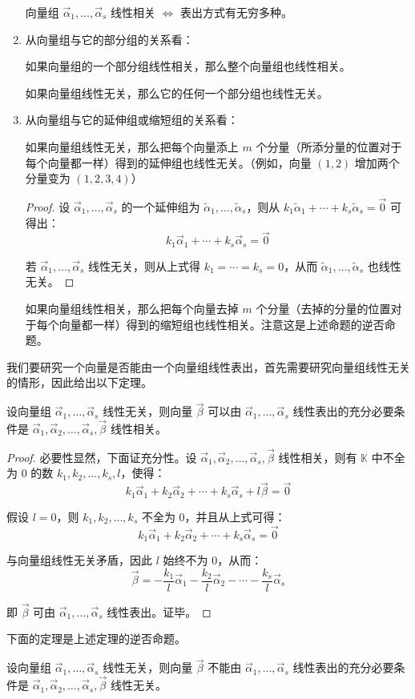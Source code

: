 \begin{enumerate}
	向量组 $\vec \alpha_1, \ldots, \vec \alpha_s$ 线性相关 $\Longleftrightarrow$ 表出方式有无穷多种。

	\item 从向量组与它的部分组的关系看：

	如果向量组的一个部分组线性相关，那么整个向量组也线性相关。

	如果向量组线性无关，那么它的任何一个部分组也线性无关。

	\item 从向量组与它的延伸组或缩短组的关系看：

	如果向量组线性无关，那么把每个向量添上 $m$ 个分量（所添分量的位置对于每个向量都一样）得到的延伸组也线性无关。（例如，向量 $(1, 2)$ 增加两个分量变为 $(1, 2, 3, 4)$）

	\begin{proof}
		设 $\vec \alpha_1, \ldots, \vec \alpha_s$ 的一个延伸组为 $\tilde \alpha_1, \ldots, \tilde \alpha_s$，则从 $k_1 \tilde \alpha_1 + \cdots + k_s \tilde \alpha_s = \vec 0$ 可得出：
		$$
		k_1 \vec \alpha_1 + \cdots + k_s \vec \alpha_s = \vec 0
		$$

		若 $\vec \alpha_1, \ldots, \vec \alpha_s$ 线性无关，则从上式得 $k_1 = \cdots = k_s = 0$，从而 $\tilde \alpha_1, \ldots, \tilde \alpha_s$ 也线性无关。
	\end{proof}

	如果向量组线性相关，那么把每个向量去掉 $m$ 个分量（去掉的分量的位置对于每个向量都一样）得到的缩短组也线性相关。注意这是上述命题的逆否命题。
\end{enumerate}

我们要研究一个向量是否能由一个向量组线性表出，首先需要研究向量组线性无关的情形，因此给出以下定理。

\begin{theorem}
	设向量组 $\vec \alpha_1, \ldots, \vec \alpha_s$ 线性无关，则向量 $\vec \beta$ 可以由 $\vec \alpha_1, \ldots, \vec \alpha_s$ 线性表出的充分必要条件是 $\vec \alpha_1, \vec \alpha_2, \ldots, \vec \alpha_s, \vec \beta$ 线性相关。
\end{theorem}

\begin{proof}
	必要性显然，下面证充分性。设 $\vec \alpha_1, \vec \alpha_2, \ldots, \vec \alpha_s, \vec \beta$ 线性相关，则有 $\mathbb K$ 中不全为 $0$ 的数 $k_1, k_2, \ldots, k_s, l$，使得：
	$$
	k_1 \vec \alpha_1 + k_2 \vec \alpha_2 + \cdots + k_s \vec \alpha_s + l \vec \beta = \vec 0
	$$

	假设 $l = 0$，则 $k_1, k_2, \ldots, k_s$ 不全为 $0$，并且从上式可得：
	$$
	k_1 \vec \alpha_1 + k_2 \vec \alpha_2 + \cdots + k_s \vec \alpha_s = \vec 0
	$$

	与向量组线性无关矛盾，因此 $l$ 始终不为 $0$，从而：
	$$
	\vec \beta = -\dfrac{k_1}{l} \vec \alpha_1 - \dfrac{k_2}{l} \vec \alpha_2 - \cdots - \dfrac{k_s}{l} \vec \alpha_s
	$$

	即 $\vec \beta$ 可由 $\vec \alpha_1, \ldots, \vec \alpha_s$ 线性表出。证毕。
\end{proof}

下面的定理是上述定理的逆否命题。

\begin{theorem}
	设向量组 $\vec \alpha_1, \ldots, \vec \alpha_s$ 线性无关，则向量 $\vec \beta$ 不能由 $\vec \alpha_1, \ldots, \vec \alpha_s$ 线性表出的充分必要条件是 $\vec \alpha_1, \vec \alpha_2, \ldots, \vec \alpha_s, \vec \beta$ 线性无关。
\end{theorem}